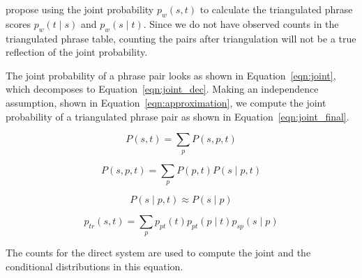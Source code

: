 \documentclass[11pt]{article}
\begin{document}
\label{sec:joint}
	\cite{Cohn:07} propose using the joint probability $p_{w}(s, t)$ to calculate the triangulated phrase scores $p_{w}(t \mid s)$ and $p_{w}(s \mid t)$. Since we do not have observed counts in the triangulated phrase table, counting the pairs after triangulation will not be a true reflection of the joint probability. %

	The joint probability of a phrase pair looks as shown in Equation~\ref{eqn:joint}, which decomposes to Equation~\ref{eqn:joint_dec}. Making an independence assumption, shown in Equation~\ref{eqn:approximation}, we compute the joint probability of a triangulated phrase pair as shown in Equation~\ref{eqn:joint_final}. 


	\begin{equation} \label{eqn:joint}
		P(s, t) = \sum_{p} P(s, p, t)
	\end{equation}

	\begin{equation} \label{eqn:joint_dec}
		P(s, p, t) = \sum_{p}P(p, t) P(s \mid p, t)
	\end{equation}


	
	\begin{equation} \label{eqn:approximation}
		P(s \mid p, t) \approx P(s \mid p)
	\end{equation}



	\begin{equation} \label{eqn:joint_final}
		p_{tr}(s, t) = \sum_{p} p_{pt}(t) p_{pt}(p \mid t) p_{sp} (s \mid p)
	\end{equation}

	The counts for the direct system are used to compute the joint and the conditional distributions in this equation.
	
\end{document}
